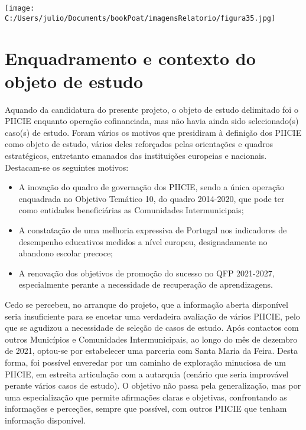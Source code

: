 \documentclass[
]{book}
\providecommand{\tightlist}{%
  \setlength{\itemsep}{0pt}\setlength{\parskip}{0pt}}
\begin{document}
\texttt{[image: C:/Users/julio/Documents/bookPoat/imagensRelatorio/figura35.jpg]}

\hypertarget{enquadramento-e-contexto-do-objeto-de-estudo}{%
\chapter{Enquadramento e contexto do objeto de estudo}\label{enquadramento-e-contexto-do-objeto-de-estudo}}

Aquando da candidatura do presente projeto, o objeto de estudo delimitado foi o PIICIE enquanto operação cofinanciada, mas não havia ainda sido selecionado(s) caso(s) de estudo. Foram vários os motivos que presidiram à definição dos PIICIE como objeto de estudo, vários deles reforçados pelas orientações e quadros estratégicos, entretanto emanados das instituições europeias e nacionais. Destacam-se os seguintes motivos:

\begin{itemize}
\tightlist
\item
  A inovação do quadro de governação dos PIICIE, sendo a única operação enquadrada no Objetivo Temático 10, do quadro 2014-2020, que pode ter como entidades beneficiárias as Comunidades Intermunicipais;
\item
  A constatação de uma melhoria expressiva de Portugal nos indicadores de desempenho educativos medidos a nível europeu, designadamente no abandono escolar precoce;
\item
  A renovação dos objetivos de promoção do sucesso no QFP 2021-2027, especialmente perante a necessidade de recuperação de aprendizagens.
\end{itemize}

Cedo se percebeu, no arranque do projeto, que a informação aberta disponível seria insuficiente para se encetar uma verdadeira avaliação de vários PIICIE, pelo que se agudizou a necessidade de seleção de casos de estudo. Após contactos com outros Municípios e Comunidades Intermunicipais, ao longo do mês de dezembro de 2021, optou-se por estabelecer uma parceria com Santa Maria da Feira. Desta forma, foi possível enveredar por um caminho de exploração minuciosa de um PIICIE, em estreita articulação com a autarquia (cenário que seria improvável perante vários casos de estudo). O objetivo não passa pela generalização, mas por uma especialização que permite afirmações claras e objetivas, confrontando as informações e perceções, sempre que possível, com outros PIICIE que tenham informação disponível.
\end{document}
